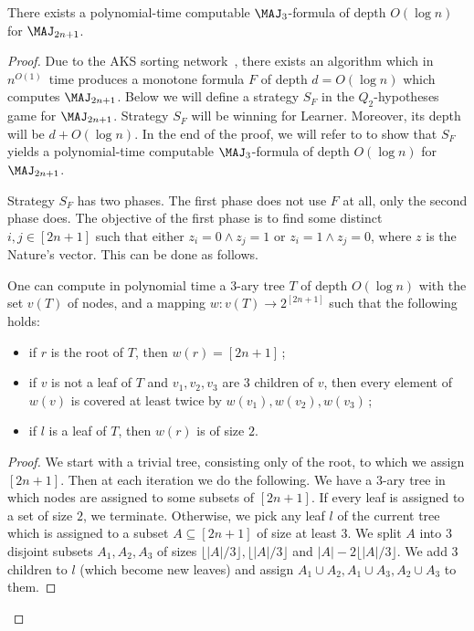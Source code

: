 \begin{theorem}
\label{cohen_conj_11}
There exists a polynomial-time computable 
%
$\MAJ_3$-formula of depth $O(\log n)$  %
for $\MAJ_{2n + 1}$.
\end{theorem}
\begin{proof}
Due to the AKS sorting network~\cite{AKS83},
there exists an algorithm which in
%
$n^{O(1)}$~time   %
produces a monotone formula $F$ of depth $d = O(\log n)$ which computes $\MAJ_{2n + 1}$. Below we will define a strategy $S_F$  in the $Q_2$-hypotheses game for $\MAJ_{2n + 1}$. Strategy $S_F$ will be winning for Learner. Moreover, its depth will be $d + O(\log n)$. In the end of the proof, we will refer to  to show that $S_F$ yields 
%
a polynomial-time computable $\MAJ_3$-formula
of depth $O(\log n)$  %
for $\MAJ_{2n + 1}$.

 Strategy $S_F$ has two phases. The first phase does not use $F$ at all, only the second phase does. The objective of the first phase is to find some distinct $i, j\in [2n + 1]$ such that either $z_i = 0 \land z_j = 1$ or $z_i = 1 \land z_j = 0$, where $z$ is the Nature's vector. This can be done as  follows.
\begin{lemma} 
\label{tree_lemma}
One can compute in polynomial time a 3-ary tree $T$ of depth $O(\log n)$ 
with the %
set $v(T)$ of nodes,   %
and a mapping $w\colon v(T) \to 2^{[2n + 1]}$ such that the following holds:
\begin{itemize}
%
\item if $r$ is the root of $T$, then $w(r) = [2n + 1]$\,;  %
\item if $v$ is not a leaf of $T$ and $v_1, v_2, v_3$ are $3$ children of $v$, then every element of $w(v)$ is covered at least twice by $w(v_1), w(v_2), w(v_3)$\,;   %
\item if $l$ is a leaf of $T$, then $w(r)$ is of size $2$.
\end{itemize}
\end{lemma}
\begin{proof}
  We start with a trivial tree, consisting only of the root, to which we assign $[2n + 1]$. Then at each iteration we do the following. We have a $3$-ary tree in which nodes are assigned to some subsets of $[2n + 1]$. If every leaf is assigned to a set of size $2$, we terminate. Otherwise, we pick any leaf $l$ of the current tree which is assigned to a subset $A\subseteq [2n + 1]$ of size at least $3$. We split $A$ into $3$ disjoint subsets $A_1, A_2, A_3$ of sizes $\lfloor |A|/3\rfloor, \lfloor |A|/3 \rfloor$ and $|A| - 2\lfloor |A|/3\rfloor$. We add $3$ children to $l$ (which become new
%
leaves)   %
and assign $A_1\cup A_2, A_1 \cup A_3, A_2 \cup A_3$ to them.


\end{proof}
\end{proof}
